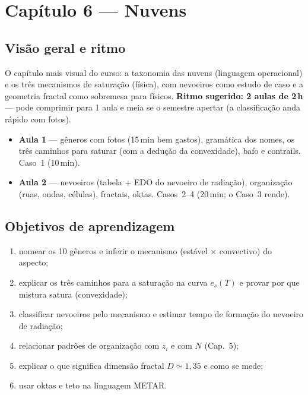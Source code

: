 \section{Capítulo 6 --- Nuvens}

\subsection*{Visão geral e ritmo}

O capítulo mais visual do curso: a taxonomia das nuvens (linguagem
operacional) e os três mecanismos de saturação (física), com nevoeiros como
estudo de caso e a geometria fractal como sobremesa para físicos.
\textbf{Ritmo sugerido: 2 aulas de 2\,h} — pode comprimir para 1 aula e
meia se o semestre apertar (a classificação anda rápido com fotos).

\begin{itemize}
  \item \textbf{Aula 1} — gêneros com fotos (15\,min bem gastos),
        gramática dos nomes, os três caminhos para saturar (com a dedução
        da convexidade), bafo e contrails. Caso~1 (10\,min).
  \item \textbf{Aula 2} — nevoeiros (tabela + EDO do nevoeiro de
        radiação), organização (ruas, ondas, células), fractais, oktas.
        Casos~2--4 (20\,min; o Caso~3 rende).
\end{itemize}

\subsection*{Objetivos de aprendizagem}

\begin{enumerate}
  \item nomear os 10 gêneros e inferir o mecanismo (estável × convectivo)
        do aspecto;
  \item explicar os três caminhos para a saturação na curva $e_s(T)$ e
        provar por que mistura satura (convexidade);
  \item classificar nevoeiros pelo mecanismo e estimar tempo de formação do
        nevoeiro de radiação;
  \item relacionar padrões de organização com $z_i$ e com $N$ (Cap.~5);
  \item explicar o que significa dimensão fractal $D \simeq 1{,}35$ e como
        se mede;
  \item usar oktas e teto na linguagem METAR.
\end{enumerate}

